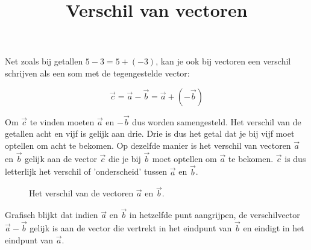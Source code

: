 \documentclass{ximera}
\title{Verschil van vectoren}
\begin{document}
\begin{abstract}

\end{abstract}
\maketitle



Net zoals bij getallen $5 - 3 = 5 + (-3)$, kan je ook bij vectoren een verschil schrijven als een som met de tegengestelde vector: 

\[ \vec{c} = \vec{a} - \vec{b} = \vec{a} + (-\vec{b}) \]

Om $\vec{c}$ te vinden moeten $\vec{a}$ en $-\vec{b}$ dus worden samengesteld. Het verschil van de getallen acht en vijf is gelijk aan drie. Drie is dus het getal dat je bij vijf moet optellen om acht te bekomen. Op dezelfde manier is het verschil van vectoren $\vec{a}$ en $\vec{b}$ gelijk aan de vector $\vec{c}$ die je bij $\vec{b}$ moet optellen om $\vec{a}$ te bekomen. $\vec{c}$ is dus letterlijk het verschil of 'onderscheid' tussen $\vec{a}$ en $\vec{b}$. 

\begin{figure}[ht!]
    \captionsetup{width=0.85\textwidth}
    \begin{center}
    \end{center}
    \caption{Het verschil van de vectoren $\vec{a}$ en $\vec{b}$.}
    \label{fig:verschil_vectoren}
\end{figure}

Grafisch blijkt dat indien $\vec{a}$ en $\vec{b}$ in hetzelfde punt aangrijpen, de verschilvector $\vec{a} - \vec{b}$ gelijk is aan de vector die vertrekt in het eindpunt van $\vec{b}$ en eindigt in het eindpunt van $\vec{a}$.
\end{document}
